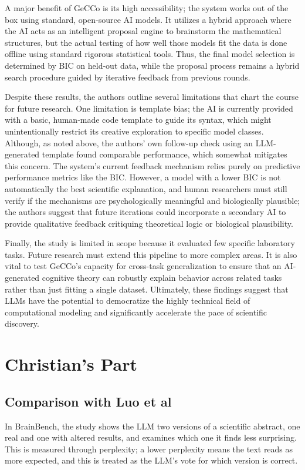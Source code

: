 A major benefit of GeCCo is its high accessibility; the system works out of the box using standard, open-source AI models. It utilizes a hybrid approach where the AI acts as an intelligent proposal engine to brainstorm the mathematical structures, but the actual testing of how well those models fit the data is done offline using standard rigorous statistical tools. Thus, the final model selection is determined by BIC on held-out data, while the proposal process remains a hybrid search procedure guided by iterative feedback from previous rounds.

Despite these results, the authors outline several limitations that chart the course for future research. One limitation is template bias; the AI is currently provided with a basic, human-made code template to guide its syntax, which might unintentionally restrict its creative exploration to specific model classes. Although, as noted above, the authors' own follow-up check using an LLM-generated template found comparable performance, which somewhat mitigates this concern. The system's current feedback mechanism relies purely on predictive performance metrics like the BIC. However, a model with a lower BIC is not automatically the best scientific explanation, and human researchers must still verify if the mechanisms are psychologically meaningful and biologically plausible; the authors suggest that future iterations could incorporate a secondary AI to provide qualitative feedback critiquing theoretical logic or biological plausibility. 

Finally, the study is limited in scope because it evaluated few specific laboratory tasks. Future research must extend this pipeline to more complex areas. It is also vital to test GeCCo's capacity for cross-task generalization to ensure that an AI-generated cognitive theory can robustly explain behavior across related tasks rather than just fitting a single dataset. Ultimately, these findings suggest that LLMs have the potential to democratize the highly technical field of computational modeling and significantly accelerate the pace of scientific discovery.
\section{Christian's Part}
\subsection{Comparison with Luo et al} 
In BrainBench, the study shows the LLM two versions of a scientific abstract, one real and one with altered results, and examines which one it finds less surprising. This is measured through perplexity; a lower perplexity means the text reads as more expected, and this is treated as the LLM's vote for which version is correct.
 
